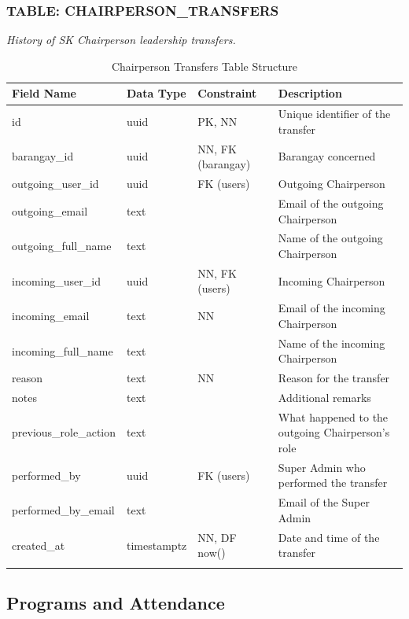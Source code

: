 \subsubsection*{TABLE: CHAIRPERSON\_TRANSFERS}
\noindent\textit{History of SK Chairperson leadership transfers.}
\begin{longtable}{|p{3.2cm}|p{2.2cm}|p{3.2cm}|p{5.4cm}|}
\hline
\textbf{Field Name} & \textbf{Data Type} & \textbf{Constraint} & \textbf{Description} \\ \hline
\endhead
\hline \endfoot
\hline \endlastfoot
id & uuid & PK, NN & Unique identifier of the transfer \\ \hline
barangay\_id & uuid & NN, FK (barangay) & Barangay concerned \\ \hline
outgoing\_user\_id & uuid & FK (users) & Outgoing Chairperson \\ \hline
outgoing\_email & text & & Email of the outgoing Chairperson \\ \hline
outgoing\_full\_name & text & & Name of the outgoing Chairperson \\ \hline
incoming\_user\_id & uuid & NN, FK (users) & Incoming Chairperson \\ \hline
incoming\_email & text & NN & Email of the incoming Chairperson \\ \hline
incoming\_full\_name & text & & Name of the incoming Chairperson \\ \hline
reason & text & NN & Reason for the transfer \\ \hline
notes & text & & Additional remarks \\ \hline
previous\_role\_action & text & & What happened to the outgoing Chairperson's role \\ \hline
performed\_by & uuid & FK (users) & Super Admin who performed the transfer \\ \hline
performed\_by\_email & text & & Email of the Super Admin \\ \hline
created\_at & timestamptz & NN, DF now() & Date and time of the transfer \\ \hline
\caption{Chairperson Transfers Table Structure}
\label{tab:chairperson_transfers}
\end{longtable}
\vspace{5mm}

\subsection{Programs and Attendance}

